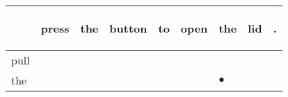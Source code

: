 \documentclass[landscape]{article}
\newcommand{\ssp}{\hspace{2pt}}
\newcommand{\mex}{\cellcolor{g}$\bullet$}
\begin{document}
\newpage

\noindent\begin{tabular}{|l|p{10pt}|p{10pt}|p{10pt}|p{10pt}|p{10pt}|p{10pt}|p{10pt}|p{10pt}|}
\hline
&\begin{sideways}\cellcolor{ref0}press\hspace{12pt}\end{sideways}&\begin{sideways}\cellcolor{ref1}the\hspace{12pt}\end{sideways}&\begin{sideways}\cellcolor{ref2}button\hspace{12pt}\end{sideways}&\begin{sideways}\cellcolor{ref3}to\hspace{12pt}\end{sideways}&\begin{sideways}\cellcolor{ref4}open\hspace{12pt}\end{sideways}&\begin{sideways}\cellcolor{ref5}the\hspace{12pt}\end{sideways}&\begin{sideways}\cellcolor{ref6}lid\hspace{12pt}\end{sideways}&\begin{sideways}\cellcolor{ref7}.\hspace{12pt}\end{sideways}\\
\hline
\ssp pull \ssp&\hspace{2pt}&\hspace{2pt}&\hspace{2pt}&\hspace{2pt}&\hspace{2pt}&\hspace{2pt}&\hspace{2pt}&\hspace{2pt}\\
\hline
\ssp \cellcolor{ref5}the \ssp&\hspace{2pt}&\hspace{2pt}&\hspace{2pt}&\hspace{2pt}&\hspace{2pt}&\hspace{2pt}\mex&\hspace{2pt}&\hspace{2pt}\\

\end{tabular}
\end{document}
